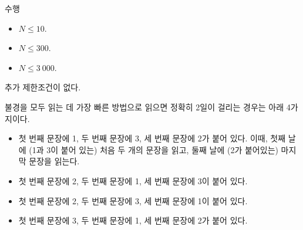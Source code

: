 \begin{problem}{수행}
	
	\begin{itemize}
		\item $N \le 10$.
	\end{itemize}

	\begin{itemize}
		\item $N \le 300$.
	\end{itemize}
	
	\begin{itemize}
		\item $N \le 3\ 000$.
	\end{itemize}



	추가 제한조건이 없다.
	
	\Examples
	
	\begin{example}
	\end{example}
	
	 불경을 모두 읽는 데 가장 빠른 방법으로 읽으면 정확히 2일이 걸리는 경우는 아래 4가지이다.
	 
	 \begin{itemize}
	 	\item 첫 번째 문장에 1, 두 번째 문장에 3, 세 번째 문장에 2가 붙어 있다. 이때, 첫째 날에 (1과 3이 붙어 있는) 처음 두 개의 문장을 읽고, 둘째 날에 (2가 붙어있는) 마지막 문장을 읽는다.
	 	\item 첫 번째 문장에 2, 두 번째 문장에 1, 세 번째 문장에 3이 붙어 있다. 
	 	\item 첫 번째 문장에 2, 두 번째 문장에 3, 세 번째 문장에 1이 붙어 있다. 
	 	\item 첫 번째 문장에 3, 두 번째 문장에 1, 세 번째 문장에 2가 붙어 있다. 
	 \end{itemize}

	\begin{example}
	\end{example}
	
	
\end{problem}

